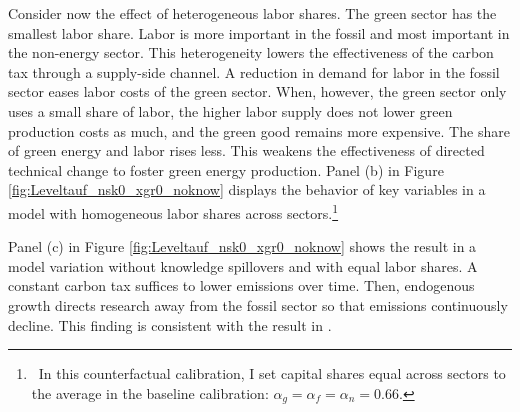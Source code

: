 Consider now the effect of heterogeneous labor shares. The green sector has the smallest labor share. Labor is more important in the fossil and most important in the non-energy sector. This heterogeneity lowers the effectiveness of the carbon tax through a supply-side channel. 
A reduction in demand for labor in the fossil sector eases labor costs of the green sector. When, however, the green sector only uses a small share of labor, the higher labor supply does not lower green production costs as much, and the green good remains more expensive. The share of green energy and labor rises less. This weakens the effectiveness of directed technical change to foster green energy production. 
Panel (b) in Figure \ref{fig:Leveltauf_nsk0_xgr0_noknow} displays the behavior of key variables in a model with homogeneous labor shares across sectors.\footnote{\ In this counterfactual calibration, I set capital shares equal across sectors to the average in the baseline calibration: $\alpha_g=\alpha_f=\alpha_n=0.66$. } 





Panel (c) in Figure \ref{fig:Leveltauf_nsk0_xgr0_noknow} shows the result in a model variation without knowledge spillovers and with equal labor shares. A constant carbon tax suffices to lower emissions over time. Then, endogenous growth directs research away from the fossil sector so that emissions continuously decline.  This finding is consistent with the result in \cite{Acemoglu2012TheChange}. %

